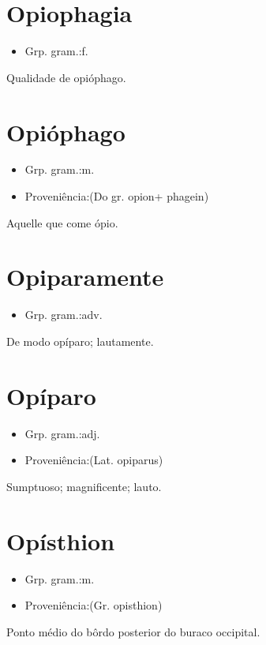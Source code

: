 \section{Opiophagia}
\begin{itemize}
\item {Grp. gram.:f.}
\end{itemize}
Qualidade de opióphago.
\section{Opióphago}
\begin{itemize}
\item {Grp. gram.:m.}
\end{itemize}
\begin{itemize}
\item {Proveniência:(Do gr. \textunderscore opion\textunderscore  + \textunderscore phagein\textunderscore )}
\end{itemize}
Aquelle que come ópio.
\section{Opiparamente}
\begin{itemize}
\item {Grp. gram.:adv.}
\end{itemize}
De modo opíparo; lautamente.
\section{Opíparo}
\begin{itemize}
\item {Grp. gram.:adj.}
\end{itemize}
\begin{itemize}
\item {Proveniência:(Lat. \textunderscore opiparus\textunderscore )}
\end{itemize}
Sumptuoso; magnificente; lauto.
\section{Opísthion}
\begin{itemize}
\item {Grp. gram.:m.}
\end{itemize}
\begin{itemize}
\item {Proveniência:(Gr. \textunderscore opisthion\textunderscore )}
\end{itemize}
Ponto médio do bôrdo posterior do buraco occipital.

